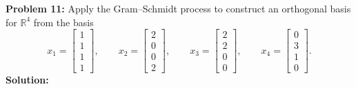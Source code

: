 \documentclass[11pt, letterpaper]{article}
\theoremstyle{definition}
\theoremstyle{remark}
\begin{document}
\vspace{0.8em}

\textbf{Problem 11:} Apply the Gram--Schmidt process to construct an orthogonal basis for $\mathbb{R}^4$ from the basis
\[
    x_1 = \begin{bmatrix} 1 \\ 1 \\ 1 \\ 1 \end{bmatrix}, \qquad
    x_2 = \begin{bmatrix} 2 \\ 0 \\ 0 \\ 2 \end{bmatrix}, \qquad
    x_3 = \begin{bmatrix} 2 \\ 2 \\ 0 \\ 0 \end{bmatrix}, \qquad
    x_4 = \begin{bmatrix} 0 \\ 3 \\ 1 \\ 0 \end{bmatrix}.
\]
\textbf{Solution:}
\end{document}
